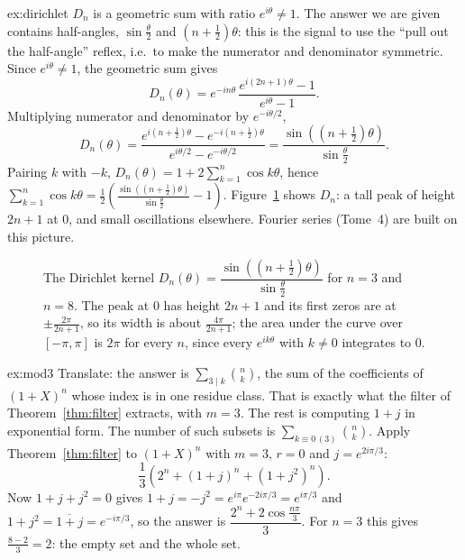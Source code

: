 \begin{solution}{ex:dirichlet}
\idea $D_n$ is a geometric sum with ratio $e^{i\theta}\ne1$. The answer we are given contains half-angles, $\sin\frac\theta2$ and $(n+\frac12)\theta$: this is the signal to use the ``pull out the half-angle'' reflex, i.e.\ to make the numerator and denominator symmetric.
\writeup Since $e^{i\theta}\ne1$, the geometric sum gives
\[
D_n(\theta)=e^{-in\theta}\,\frac{e^{i(2n+1)\theta}-1}{e^{i\theta}-1}.
\]
Multiplying numerator and denominator by $e^{-i\theta/2}$,
\[
D_n(\theta)=\frac{e^{i(n+\frac12)\theta}-e^{-i(n+\frac12)\theta}}{e^{i\theta/2}-e^{-i\theta/2}}
=\frac{\sin\left((n+\frac12)\theta\right)}{\sin\frac\theta2}.
\]
Pairing $k$ with $-k$, $D_n(\theta)=1+2\sum_{k=1}^n\cos k\theta$, hence
$\displaystyle\sum_{k=1}^n\cos k\theta=\frac12\left(\frac{\sin\left((n+\frac12)\theta\right)}{\sin\frac\theta2}-1\right)$.
Figure~\ref{fig:dirichlet} shows $D_n$: a tall peak of height $2n+1$ at $0$, and small oscillations elsewhere. Fourier series (Tome~4) are built on this picture.
\end{solution}

\begin{figure}[ht]
\centering
{}
\caption{The Dirichlet kernel $D_n(\theta)=\dfrac{\sin\left((n+\frac12)\theta\right)}{\sin\frac\theta2}$ for $n=3$ and $n=8$. The peak at $0$ has height $2n+1$ and its first zeros are at $\pm\frac{2\pi}{2n+1}$, so its width is about $\frac{4\pi}{2n+1}$; the area under the curve over $[-\pi,\pi]$ is $2\pi$ for every $n$, since every $e^{ik\theta}$ with $k\ne0$ integrates to $0$.}
\label{fig:dirichlet}
\end{figure}

\begin{solution}{ex:mod3}
\idea Translate: the answer is $\sum_{3\mid k}\binom nk$, the sum of the coefficients of $(1+X)^n$ whose index is in one residue class. That is exactly what the filter of Theorem~\ref{thm:filter} extracts, with $m=3$. The rest is computing $1+j$ in exponential form.
\writeup The number of such subsets is $\sum_{k\equiv0\,(3)}\binom nk$. Apply Theorem~\ref{thm:filter} to $(1+X)^n$ with $m=3$, $r=0$ and
$j=e^{2i\pi/3}$:
\[
\frac13\left(2^n+(1+j)^n+(1+j^2)^n\right).
\]
Now $1+j+j^2=0$ gives $1+j=-j^2=e^{i\pi}e^{-2i\pi/3}=e^{i\pi/3}$ and $1+j^2=\overline{1+j}=e^{-i\pi/3}$, so the answer is $\dfrac{2^n+2\cos\frac{n\pi}3}3$.
For $n=3$ this gives $\frac{8-2}3=2$: the empty set and the whole set.
\end{solution}

